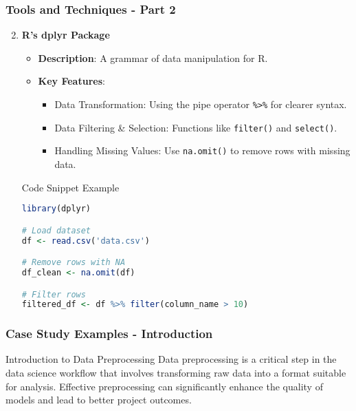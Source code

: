 \documentclass[aspectratio=169]{beamer}
\begin{document}
\begin{frame}[fragile]
    \frametitle{Tools and Techniques - Part 2}
    \begin{enumerate}
        \setcounter{enumi}{1}
        \item \textbf{R's dplyr Package}
            \begin{itemize}
                \item \textbf{Description}: A grammar of data manipulation for R.
                \item \textbf{Key Features}:
                    \begin{itemize}
                        \item Data Transformation: Using the pipe operator \texttt{\%>\%} for clearer syntax.
                        \item Data Filtering \& Selection: Functions like \texttt{filter()} and \texttt{select()}.
                        \item Handling Missing Values: Use \texttt{na.omit()} to remove rows with missing data.
                    \end{itemize}
            \end{itemize}
            \begin{block}{Code Snippet Example}
                \begin{lstlisting}[language=R]
library(dplyr)

# Load dataset
df <- read.csv('data.csv')

# Remove rows with NA
df_clean <- na.omit(df)

# Filter rows
filtered_df <- df %>% filter(column_name > 10)
                \end{lstlisting}
            \end{block}
    \end{enumerate}
\end{frame}

\begin{frame}[fragile]
    \frametitle{Case Study Examples - Introduction}
    \begin{block}{Introduction to Data Preprocessing}
        Data preprocessing is a critical step in the data science workflow that involves transforming raw data into a format suitable for analysis. Effective preprocessing can significantly enhance the quality of models and lead to better project outcomes. 
    \end{block}
\end{frame}
\end{document}
